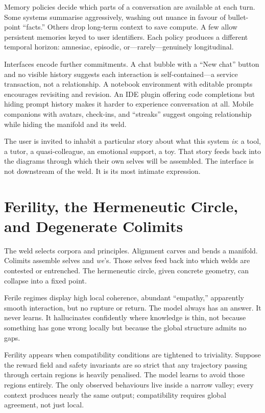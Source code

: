 Memory policies decide which parts of a conversation are available at each turn. Some systems summarise aggressively, washing out nuance in favour of bullet-point ``facts.'' Others drop long-term context to save compute. A few allow persistent memories keyed to user identifiers. Each policy produces a different temporal horizon: amnesiac, episodic, or---rarely---genuinely longitudinal.

Interfaces encode further commitments. A chat bubble with a ``New chat'' button and no visible history suggests each interaction is self-contained---a service transaction, not a relationship. A notebook environment with editable prompts encourages revisiting and revision. An IDE plugin offering code completions but hiding prompt history makes it harder to experience conversation at all. Mobile companions with avatars, check-ins, and ``streaks'' suggest ongoing relationship while hiding the manifold and its weld.

The user is invited to inhabit a particular story about what this system \emph{is}: a tool, a tutor, a quasi-colleague, an emotional support, a toy. That story feeds back into the diagrams through which their own selves will be assembled. The interface is not downstream of the weld. It is its most intimate expression.

\section{Ferility, the Hermeneutic Circle, and Degenerate Colimits}

The weld selects corpora and principles. Alignment carves and bends a manifold. Colimits assemble selves and \emph{we}'s. Those selves feed back into which welds are contested or entrenched. The hermeneutic circle, given concrete geometry, can collapse into a fixed point.

Ferile regimes display high local coherence, abundant ``empathy,'' apparently smooth interaction, but no rupture or return. The model always has an answer. It never learns. It hallucinates confidently where knowledge is thin, not because something has gone wrong locally but because the global structure admits no gaps.

Ferility appears when compatibility conditions are tightened to triviality. Suppose the reward field and safety invariants are so strict that any trajectory passing through certain regions is heavily penalised. The model learns to avoid those regions entirely. The only observed behaviours live inside a narrow valley; every context produces nearly the same output; compatibility requires global agreement, not just local.

